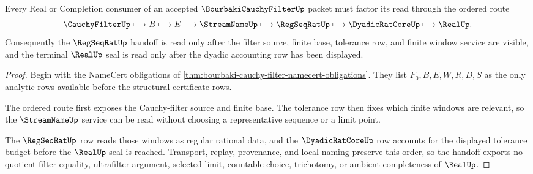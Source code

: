 \begin{theorem}
\label{thm:bourbaki-cauchy-filter-regseqrat-handoff}
Every Real or Completion consumer of an accepted $\BourbakiCauchyFilterUp$ packet must factor its read through the ordered route
$$
\CauchyFilterUp \longmapsto B \longmapsto E \longmapsto \StreamNameUp \longmapsto \RegSeqRatUp \longmapsto \DyadicRatCoreUp \longmapsto \RealUp .
$$
Consequently the $\RegSeqRatUp$ handoff is read only after the filter source, finite base, tolerance row, and finite window service are visible, and the terminal $\RealUp$ seal is read only after the dyadic accounting row has been displayed.
\end{theorem}
\begin{proof}
Begin with the NameCert obligations of \autoref{thm:bourbaki-cauchy-filter-namecert-obligations}. They list $F_0,B,E,W,R,D,S$ as the only analytic rows available before the structural certificate rows.

The ordered route first exposes the Cauchy-filter source and finite base. The tolerance row then fixes which finite windows are relevant, so the $\StreamNameUp$ service can be read without choosing a representative sequence or a limit point.

The $\RegSeqRatUp$ row reads those windows as regular rational data, and the $\DyadicRatCoreUp$ row accounts for the displayed tolerance budget before the $\RealUp$ seal is reached. Transport, replay, provenance, and local naming preserve this order, so the handoff exports no quotient filter equality, ultrafilter argument, selected limit, countable choice, trichotomy, or ambient completeness of $\RealUp$.
\end{proof}


\begin{closurestatus}{\BourbakiCauchyFilterUp}
  \theoryclosure{\seedClosure}
  \formalstatus{\unformalizedV}
\end{closurestatus}
